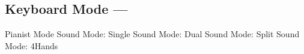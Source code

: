 \subsection[Keyboard Mode]{Keyboard Mode --- \UiKey{\SND}}
Pianist Mode
Sound Mode: Single
Sound Mode: Dual
Sound Mode: Split
Sound Mode: 4Hands
